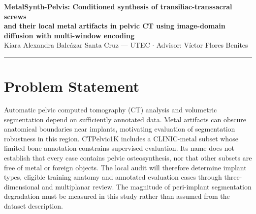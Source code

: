 \documentclass[9pt]{extarticle}
\begin{document}
\begin{center}
  {\Large\bfseries MetalSynth-Pelvis: Conditioned synthesis of transiliac-transsacral screws\\[2pt]
  and their local metal artifacts in pelvic CT using image-domain diffusion with multi-window encoding}\\[3pt]
  {\normalsize Kiara Alexandra Balc\'azar Santa Cruz --- UTEC \quad $\cdot$ \quad Advisor: V\'ictor Flores Benites}
\end{center}
\vspace{2pt}\hrule\vspace{6pt}

\section{Problem Statement}

Automatic pelvic computed tomography (CT) analysis and volumetric segmentation depend on sufficiently annotated data. Metal artifacts can obscure anatomical boundaries near implants, motivating evaluation of segmentation robustness in this region. CTPelvic1K \citep{liu2021ctpelvic1k} includes a CLINIC-metal subset whose limited bone annotation constrains supervised evaluation. Its name does not establish that every case contains pelvic osteosynthesis, nor that other subsets are free of metal or foreign objects. The local audit will therefore determine implant types, eligible training anatomy and annotated evaluation cases through three-dimensional and multiplanar review. The magnitude of peri-implant segmentation degradation must be measured in this study rather than assumed from the dataset description.
\end{document}
